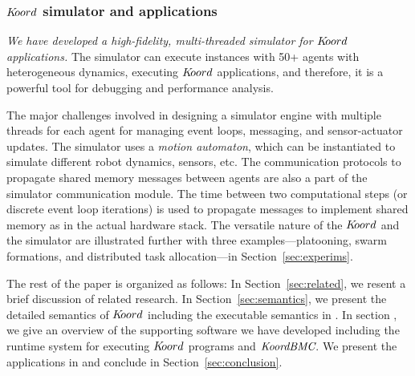\subsubsection{$K\kern-2pt oord$ simulator and applications}

{\em We have developed a high-fidelity, multi-threaded simulator for $K\kern-2pt oord$ applications.} The simulator can execute instances with 50+ agents with heterogeneous dynamics, executing $K\kern-2pt oord$ applications, and therefore, it is a powerful tool for debugging and performance analysis.  

The major challenges involved in designing a simulator  engine with multiple threads for each agent for managing event loops, messaging, and sensor-actuator updates. 
The simulator uses a {\em motion automaton\/}, which can be instantiated to simulate different robot dynamics, sensors, etc. The communication protocols to propagate shared memory messages between agents are also a part of the simulator communication module. The time between two computational steps (or discrete event loop iterations) is used to propagate messages to implement shared memory as in the actual hardware stack. 
The versatile nature of the $K\kern-2pt oord$ and the simulator are illustrated further with three examples---platooning,  swarm formations, and distributed task allocation---in Section~\ref{sec:experims}.

The rest of the paper is organized as follows:
In Section~\ref{sec:related}, we resent a brief discussion of related research. In Section~\ref{sec:semantics}, we present the detailed semantics of $K\kern-2pt oord$ including the executable semantics in \K. In section , we give an overview of the supporting software we have developed including the runtime system for executing $K\kern-2pt oord$ programs and $\emph{KoordBMC}$. We present the applications in  and conclude in Section~\ref{sec:conclusion}.







